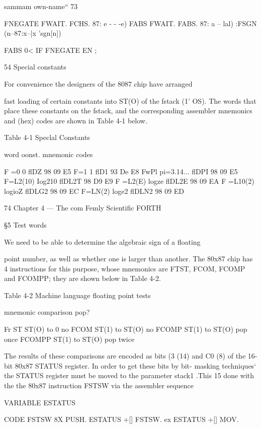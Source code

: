 {{sammam own-name“ 73

FNEGATE FWAIT. FCHS. 87: e - - -e)
FABS FWAIT. FABS. 87: a -- lal)
:FSGN (n--87:x--|x 'sgn[n])

FABS 0< IF FNEGATE EN ;

54 Special constants

For convenience the designers of the 8087 chip have arranged

fast loading of certain constants into ST(O) of the fstack (1' OS).
The words that place these constants on the fstack, and the
corresponding assembler mnemonics and (hex) codes are shown
in Table 4-1 below.

 

Table 4-1 Speclal Constants

word oonst. mnemonic codes

F =0 0 flDZ 98 09 E5
F=1 1 flD1 93 De E8
FwPl pi=3.14... flDPI 98 09 E5
F=L2(10) Iog210 flDL2T 98 D9 E9
F =L2(E) logze flDL2E 98 09 EA
F =L10(2) logioZ flDLG2 98 09 EC
F=LN(2) loge2 flDLN2 98 09 ED

 

 

 

74 Chapter 4 — The com Femly Scientific FORTH

§5 Test words

We need to be able to determine the algebraic sign of a floating

point number, as well as whether one is larger than another.
The 80x87 chip has 4 instructions for this purpose, whose
mnemonics are FTST, FCOM, FCOMP and FCOMPP; they are
shown below in Table 4-2.

Table 4-2 Machine language floating point tests

 

mnemonic comparison pop?

Fr ST ST(O) to 0 no
FCOM ST(1) to ST(O) no
FCOMP ST(1) to ST(O) pop once
FCOMPP ST(1) to ST(O) pop twice

 

 

 

The results of these comparisons are encoded as bits (3 (14) and
C0 (8) of the 16-bit 80x87 STATUS register. In order to get these
bits by bit- masking techniques‘ the STATUS register must be
moved to the parameter stack1 .This 15 done with the the 80x87
instruction FSTSW via the assembler sequence

VARIABLE ESTATUS

CODE FSTSW 8X PUSH.
ESTATUS +[] FSTSW.
ex ESTATUS +[] MOV.

}}
